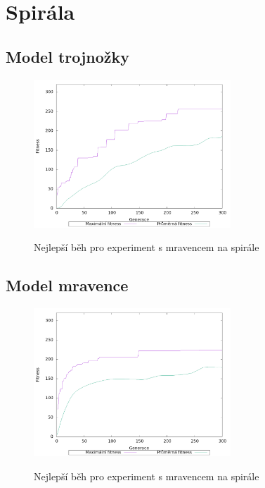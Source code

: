 \section{Spirála}

\subsection{Model trojnožky}
\begin{figure}[h]
    \centering
    {\includegraphics[width=20em]{obrazky/trojnozka_spirala_fitness_prubeh.png}}
    \caption{
    Nejlepší běh pro experiment s mravencem na spirále
    }
    \label{fig:trojnozka_spirala_fitness_prubeh}
\end{figure}

\subsection{Model mravence}
\begin{figure}[h]
    \centering
    {\includegraphics[width=20em]{obrazky/mravenec_spirala_fitness_prubeh.png}}
    \caption{
    Nejlepší běh pro experiment s mravencem na spirále
    }
    \label{fig:mravenec_spirala_fitness_prubeh}
\end{figure}














